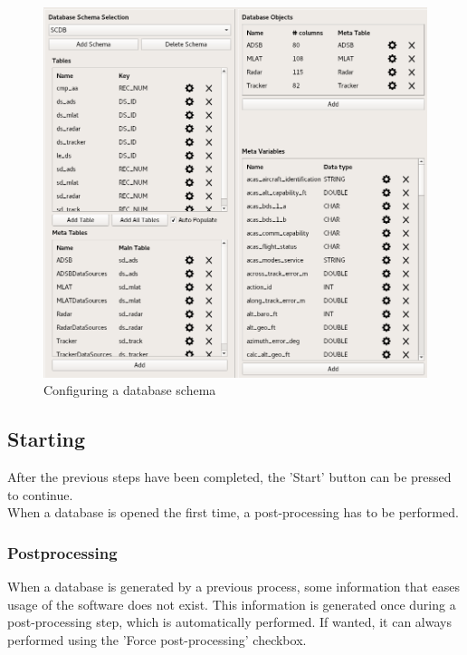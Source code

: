 \documentclass[10pt,letterpaper,extrafontsizes]{memoir}
\begin{document}
\begin{figure}[H]
  \hspace*{-1cm}
    \includegraphics[width=16cm,frame]{../screenshots/database_schema_configuration.png}
  \caption{Configuring a database schema}
  \label{fig:db_schema_configuration}
\end{figure}

\subsection{Starting}

After the previous steps have been completed, the 'Start' button can be pressed to continue. \\

When a database is opened the first time, a post-processing has to be performed.

\subsubsection{Postprocessing}
When a database is generated by a previous process,  some information that eases usage of the software does not exist. This information is generated once during a post-processing step, which is automatically performed. If wanted, it can always performed using the 'Force post-processing' checkbox.
\end{document}

